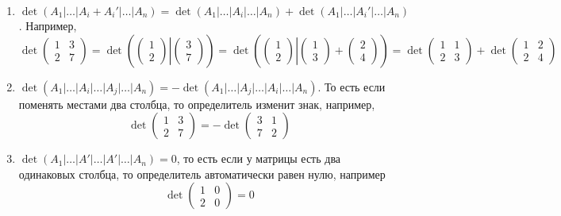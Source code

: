 \documentclass{article}
\begin{document}
\begin{enumerate}
	\item $\det(A_1|\ldots|A_i + A_i'|\ldots|A_n) = \det(A_1|\ldots|A_i|\ldots|A_n) + \det(A_1|\ldots|A_i'|\ldots|A_n)$. Например,
	\[
	\det
	\begin{pmatrix}
		{1}&{3}\\
		{2}&{7}
	\end{pmatrix}
	=
	\det
	\left(\left.
	\begin{pmatrix}
		{1}\\{2}
	\end{pmatrix}
	\right|
	\begin{pmatrix}
		{3}\\{7}
	\end{pmatrix}
	\right)
	=
	\det
	\left(\left.
	\begin{pmatrix}
		{1}\\{2}
	\end{pmatrix}
	\right|
	\begin{pmatrix}
		{1}\\{3}
	\end{pmatrix}
	+
	\begin{pmatrix}
		{2}\\{4}
	\end{pmatrix}
	\right)
	=
	\det
	\begin{pmatrix}
		{1}&{1}\\
		{2}&{3}
	\end{pmatrix}
	+
	\det
	\begin{pmatrix}
		{1}&{2}\\
		{2}&{4}
	\end{pmatrix}
	\]
	
	
	\item $\det(A_1|\ldots|A_i|\ldots|A_j|\ldots|A_n) = -\det(A_1|\ldots|A_j|\ldots|A_i|\ldots|A_n)$. То есть если поменять местами два столбца, то определитель изменит знак, например,
	\[
	\det
	\begin{pmatrix}
		{1}&{3}\\
		{2}&{7}
	\end{pmatrix}
	=-
	\det
	\begin{pmatrix}
		{3}&{1}\\
		{7}&{2}
	\end{pmatrix}
	\]
	
	
	\item $\det(A_1|\ldots|A'|\ldots|A'|\ldots|A_n) = 0$, то есть если у матрицы есть два одинаковых столбца, то определитель автоматически равен нулю, например
	\[
	\det
	\begin{pmatrix}
		{1}&{0}\\
		{2}&{0}
	\end{pmatrix} = 0
	\]
	

\end{enumerate}
\end{document}

